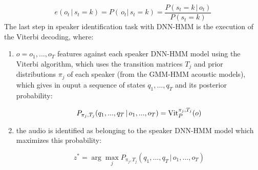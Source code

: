 $$e(o_t \, | \, s_{t} = k) = P(\, o_t | \, s_{t} = k) = \frac{P(s_{t} = k \, | \, o_t)}{P(s_{t} = k)}$$
The last step in speaker identification task with DNN-HMM is the execution of the Viterbi decoding, where:

\begin{enumerate}[label=(\roman*), font=\itshape]
	\item $o = o_1, ..., o_T$ features against each speaker DNN-HMM model using the Viterbi algorithm, which uses the transition matrices $T_j$ and prior distributions $\pi_j$ of each speaker (from the GMM-HMM acoustic models), which gives in ouput a sequence of states $q_1, ..., q_T$ and its posterior probability:
	
	$$P_{\pi_j, T_j}(q_1, ..., q_T \, | \, o_1, ..., o_T) = \operatorname{Vit}_{P}^{\pi_j, T_j}(o)$$
	
	\item the audio is identified as belonging to the speaker DNN-HMM model which maximizes this probability:
	
	$$z^* = \arg \max_j P_{\pi_j, T_j}(q_1, ..., q_T \, | \, o_1, ..., o_T)$$
\end{enumerate}